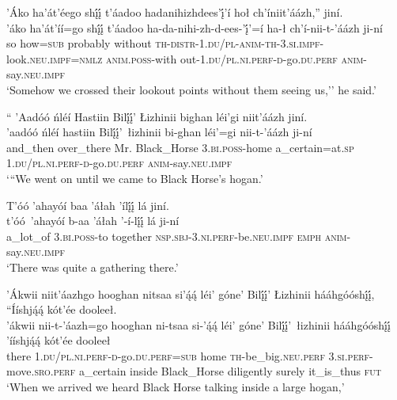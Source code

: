 \ea\label{ex:text2-17-7}
’Áko ha’át’éego shį́į́ t’áadoo hadanihizhdees’į́’í hoł ch’íniit’áázh,'' jiní.\\
\gll ’áko	ha’át’íí=go	shį́į́	t’áadoo	ha-da-nihi-zh-d-ees-’į́’=í	ha-ł	ch’í-nii-t-’áázh	ji-ní\\
     so	how=\textsc{sub}	probably	without	\textsc{th}-\textsc{distr}-1.\textsc{du}/\textsc{pl}-\textsc{anim}-\textsc{th}-3.\textsc{si}.\textsc{impf}-look.\textsc{neu}.\textsc{impf}=\textsc{nmlz}	\textsc{anim}.\textsc{poss}-with	out-1.\textsc{du}/\textsc{pl}.\textsc{ni}.\textsc{perf}-\textsc{d}-go.\textsc{du}.\textsc{perf}	\textsc{anim}-say.\textsc{neu}.\textsc{impf}\\
\glt `Somehow we crossed their lookout points without them seeing us,'' he said.'
\z

\ea\label{ex:text2-18-1}
`` ’Aadóó ńléí Hastiin Bilį́į́’ Łizhinii bighan léi’gi niit’áázh jiní.\\
\gll ’aadóó	ńléí	hastiin	Bilį́į́’~{łizhinii}	bi-ghan	léi’=gi	nii-t-’áázh	ji-ní\\
     and\_then	over\_there	Mr.	Black\_Horse	3.\textsc{bi}.\textsc{poss}-home	a\_certain=at.\textsc{sp}	1.\textsc{du}/\textsc{pl}.\textsc{ni}.\textsc{perf}-\textsc{d}-go.\textsc{du}.\textsc{perf}	\textsc{anim}-say.\textsc{neu}.\textsc{impf}\\
\glt `{``}We went on until we came to Black Horse's hogan.'
\z

\ea\label{ex:text2-18-2}
T’óó ’ahayóí baa ’áłah ’ílį́į́ lá jiní.\\
\gll t’óó~{’ahayóí}	b-aa	’áłah	’-í-lį́į́	lá	ji-ní\\
     a\_lot\_of	3.\textsc{bi}.\textsc{poss}-to	together	\textsc{nsp}.\textsc{sbj}-3.\textsc{ni}.\textsc{perf}-be.\textsc{neu}.\textsc{impf}	\textsc{emph}	\textsc{anim}-say.\textsc{neu}.\textsc{impf}\\
\glt `There was quite a gathering there.'
\z

\ea\label{ex:text2-18-3}
’Ákwii niit’áazhgo hooghan nitsaa si’ą́ą́ léi’ góne’ Bilį́į́’ Łizhinii hááhgóóshį́į́, ``Ííshją́ą́ kót’ée dooleeł.\\
\gll ’ákwii	nii-t-’áazh=go	hooghan	ni-tsaa	si-’ą́ą́	léi’	góne’	Bilį́į́’~{łizhinii}	hááhgóóshį́į́	’ííshją́ą́	kót’ée	dooleeł\\
     there	1.\textsc{du}/\textsc{pl}.\textsc{ni}.\textsc{perf}-\textsc{d}-go.\textsc{du}.\textsc{perf}=\textsc{sub}	home	\textsc{th}-be\_big.\textsc{neu}.\textsc{perf}	3.\textsc{si}.\textsc{perf}-move.\textsc{sro}.\textsc{perf}	a\_certain	inside	Black\_Horse	diligently	surely	it\_is\_thus	\textsc{fut}\\
\glt `When we arrived we heard Black Horse talking inside a large hogan,'
\z

